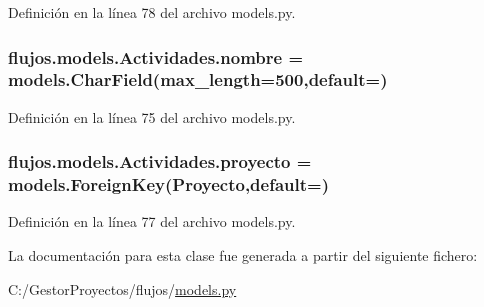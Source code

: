 Definición en la línea 78 del archivo models.\+py.

\subsubsection[{\texorpdfstring{nombre}{nombre}}]{\setlength{\rightskip}{0pt plus 5cm}flujos.\+models.\+Actividades.\+nombre = models.\+Char\+Field(max\+\_\+length=500,default=\textquotesingle{}\textquotesingle{})\hspace{0.3cm}{\ttfamily [static]}}\hypertarget{classflujos_1_1models_1_1_actividades_aa89000f61f5d28c782f2e203fb8ec5e4}{}\label{classflujos_1_1models_1_1_actividades_aa89000f61f5d28c782f2e203fb8ec5e4}


Definición en la línea 75 del archivo models.\+py.

\subsubsection[{\texorpdfstring{proyecto}{proyecto}}]{\setlength{\rightskip}{0pt plus 5cm}flujos.\+models.\+Actividades.\+proyecto = models.\+Foreign\+Key({\bf Proyecto},default=\textquotesingle{}\textquotesingle{})\hspace{0.3cm}{\ttfamily [static]}}\hypertarget{classflujos_1_1models_1_1_actividades_a6a0d8446b89654ce08dd207e9fa0916e}{}\label{classflujos_1_1models_1_1_actividades_a6a0d8446b89654ce08dd207e9fa0916e}


Definición en la línea 77 del archivo models.\+py.



La documentación para esta clase fue generada a partir del siguiente fichero\+:\begin{DoxyCompactItemize}
\item 
C\+:/\+Gestor\+Proyectos/flujos/\hyperlink{flujos_2models_8py}{models.\+py}\end{DoxyCompactItemize}
